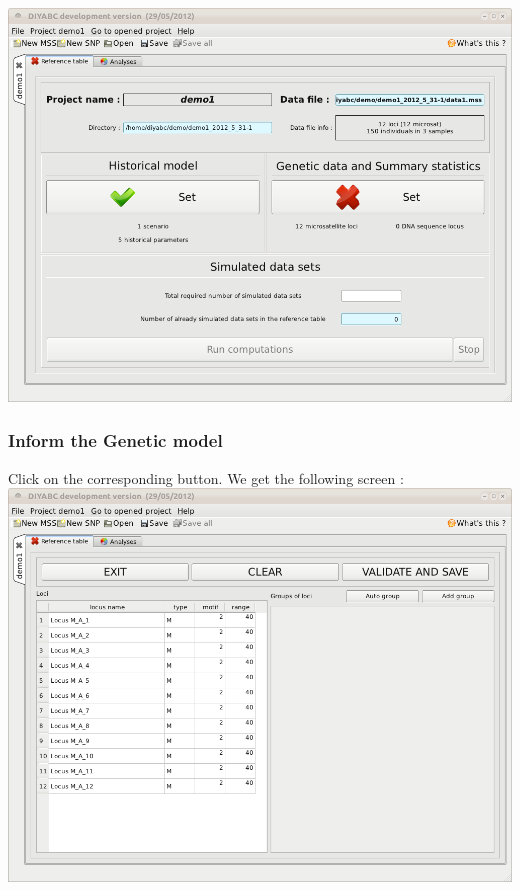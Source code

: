\includegraphics[scale=0.35]{gui_pictures/Capture-DIYABC-14.png} 

 \newpage
\subsubsection{Inform the Genetic model}

Click on the corresponding  button. We get the following screen : \\

\includegraphics[scale=0.35]{gui_pictures/Capture-DIYABC-15.png} 

